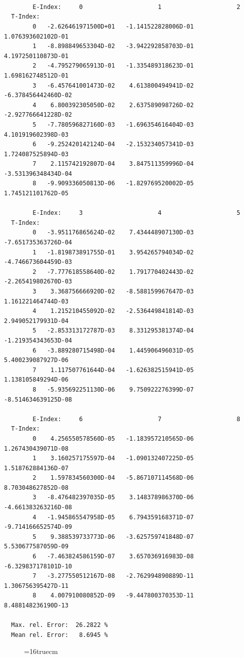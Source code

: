 \documentclass[12pt,dvips]{article}
\begin{document}
\begin{small}\begin{verbatim}



        E-Index:     0                     1                     2
  T-Index:
        0   -2.626461971500D+01   -1.141522828006D-01    1.076393602102D-01
        1   -8.898849653304D-02   -3.942292858703D-01    4.197250110873D-01
        2   -4.795279065913D-01   -1.335489318623D-01    1.698162748512D-01
        3   -6.457641001473D-02    4.613800494941D-02   -6.378456442460D-02
        4    6.800392305050D-02    2.637589098726D-02   -2.927766641228D-02
        5   -7.780596827160D-03   -1.696354616404D-03    4.101919602398D-03
        6   -9.252420142124D-04   -2.153234057341D-03    1.724087525894D-03
        7    2.115742192807D-04    3.847511359996D-04   -3.531396348434D-04
        8   -9.909336050813D-06   -1.829769520002D-05    1.745121101762D-05

        E-Index:     3                     4                     5
  T-Index:
        0   -3.951176865624D-02    7.434448907130D-03   -7.651735363726D-04
        1   -1.819873891755D-01    3.954265794034D-02   -4.746673604459D-03
        2   -7.777618558640D-02    1.791770402443D-02   -2.265419802670D-03
        3    3.368756666920D-02   -8.588159967647D-03    1.161221464744D-03
        4    1.215210455092D-02   -2.536449841814D-03    2.949052179931D-04
        5   -2.853313172787D-03    8.331295381374D-04   -1.219354343653D-04
        6   -3.889280715498D-04    1.445906496031D-05    5.400239087927D-06
        7    1.117507761644D-04   -1.626382515941D-05    1.138105849294D-06
        8   -5.935692251130D-06    9.750922276399D-07   -8.514634639125D-08

        E-Index:     6                     7                     8
  T-Index:
        0    4.256550578560D-05   -1.183957210565D-06    1.267430439071D-08
        1    3.160257175597D-04   -1.090132407225D-05    1.518762884136D-07
        2    1.597834560300D-04   -5.867107114568D-06    8.703048627852D-08
        3   -8.476482397035D-05    3.148378986370D-06   -4.661383263216D-08
        4   -1.945865547958D-05    6.794359168371D-07   -9.714166652574D-09
        5    9.388539733773D-06   -3.625759741848D-07    5.530677587059D-09
        6   -7.463824586159D-07    3.657036916983D-08   -6.329837178101D-10
        7   -3.277550512167D-08   -2.762994890889D-11    1.306756395427D-11
        8    4.007910080852D-09   -9.447800370353D-11    8.488148236190D-13

  Max. rel. Error:  26.2822 %
  Mean rel. Error:   8.6945 %

\end{verbatim}\end{small}
\begin{figure} \label{2.1.8ro}
\epsfxsize=16truecm
\end{figure}
\newpage
\end{document}
